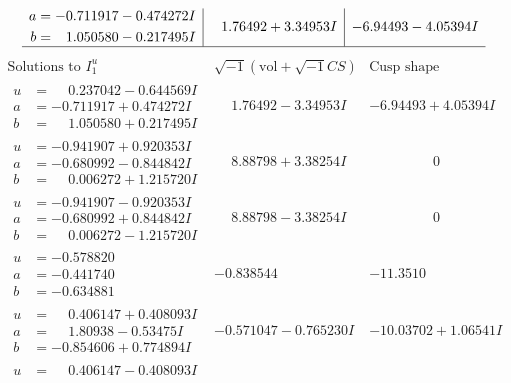 \documentclass[1p]{elsarticle_modified}
\theoremstyle{definition}
\newcommand{\I}{\sqrt{-1}}
\begin{document}
$$\begin{array}{c|c|c}
\begin{aligned}
a &= -0.711917 - 0.474272 I \\
b &= \phantom{-}1.050580 - 0.217495 I\end{aligned}
 & \phantom{-}1.76492 + 3.34953 I & -6.94493 - 4.05394 I\\
 \hline 
 \end{array}$$\newpage$$\begin{array}{c|c|c}  
\text{Solutions to }I^u_{1}& \I (\text{vol} + \sqrt{-1}CS) & \text{Cusp shape}\\
 \hline 
\begin{aligned}
u &= \phantom{-}0.237042 - 0.644569 I \\
a &= -0.711917 + 0.474272 I \\
b &= \phantom{-}1.050580 + 0.217495 I\end{aligned}
 & \phantom{-}1.76492 - 3.34953 I & -6.94493 + 4.05394 I \\ \hline\begin{aligned}
u &= -0.941907 + 0.920353 I \\
a &= -0.680992 - 0.844842 I \\
b &= \phantom{-}0.006272 + 1.215720 I\end{aligned}
 & \phantom{-}8.88798 + 3.38254 I & \phantom{-0.000000 } 0 \\ \hline\begin{aligned}
u &= -0.941907 - 0.920353 I \\
a &= -0.680992 + 0.844842 I \\
b &= \phantom{-}0.006272 - 1.215720 I\end{aligned}
 & \phantom{-}8.88798 - 3.38254 I & \phantom{-0.000000 } 0 \\ \hline\begin{aligned}
u &= -0.578820\phantom{ +0.000000I} \\
a &= -0.441740\phantom{ +0.000000I} \\
b &= -0.634881\phantom{ +0.000000I}\end{aligned}
 & -0.838544\phantom{ +0.000000I} & -11.3510\phantom{ +0.000000I} \\ \hline\begin{aligned}
u &= \phantom{-}0.406147 + 0.408093 I \\
a &= \phantom{-}1.80938 - 0.53475 I \\
b &= -0.854606 + 0.774894 I\end{aligned}
 & -0.571047 - 0.765230 I & -10.03702 + 1.06541 I \\ \hline\begin{aligned}
u &= \phantom{-}0.406147 - 0.408093 I \\

\end{aligned}
\end{array}$$
\end{document}
